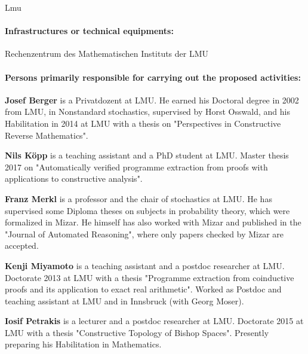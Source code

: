 \begin{sitedescription}{Lmu}
\paragraph*{Infrastructures or technical equipments:}

\begin{compactitem}
\item Rechenzentrum des Mathematischen Instituts der LMU 
\end{compactitem}

\paragraph*{Persons primarily responsible for carrying out the proposed activities:}

\begin{compactitem}

\item \textbf{Josef Berger} is a Privatdozent at LMU.  He earned his
  Doctoral degree in 2002 from LMU, in Nonstandard stochastics,
  supervised by Horst Osswald, and his Habilitation in 2014 at LMU
  with a thesis on "Perspectives in Constructive Reverse Mathematics".

\item \textbf{Nils K\"opp} is a teaching assistant and a PhD student
  at LMU.  Master thesis 2017 on "Automatically verified programme
  extraction from proofs with applications to constructive analysis".

\item \textbf{Franz Merkl} is a professor and the chair of stochastics
  at LMU.  He has supervised some Diploma theses on subjects in
  probability theory, which were formalized in Mizar.  He himself has
  also worked with Mizar and published in the "Journal of Automated
  Reasoning", where only papers checked by Mizar are accepted.

\item \textbf{Kenji Miyamoto} is a teaching assistant and a postdoc
  researcher at LMU.  Doctorate 2013 at LMU with a thesis "Programme
  extraction from coinductive proofs and its application to exact real
  arithmetic".  Worked as Postdoc and teaching assistant at LMU and in
  Innsbruck (with Georg Moser).

\item \textbf{Iosif Petrakis} is a lecturer and a postdoc researcher
  at LMU.  Doctorate 2015 at LMU with a thesis "Constructive Topology
  of Bishop Spaces".  Presently preparing his Habilitation in
  Mathematics.


\end{compactitem}
\end{sitedescription}
